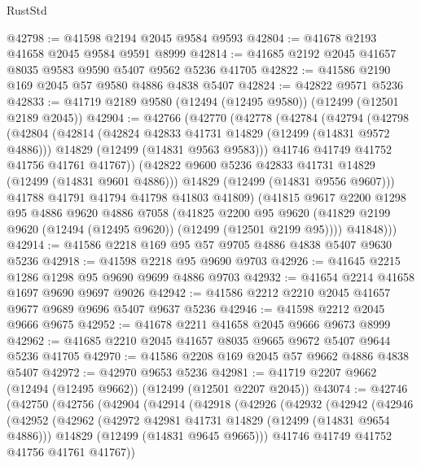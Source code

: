 \begin{lexlean}{RustStd}
\begin{coremodule}
@42798 := @41598 @2194 @2045 @9584 @9593
@42804 := @41678 @2193 @41658 @2045 @9584 @9591 @8999
@42814 := @41685 @2192 @2045 @41657 @8035 @9583 @9590 @5407 @9562 @5236 @41705
@42822 := @41586 @2190 @169 @2045 @57 @9580 @4886 @4838 @5407
@42824 := @42822 @9571 @5236
@42833 := @41719 @2189 @9580 (@12494 (@12495 @9580)) (@12499 (@12501 @2189 @2045))
@42904 := @42766
    (@42770
      (@42778
        (@42784
          (@42794
            (@42798
              (@42804
                (@42814
                  (@42824 @42833 @41731 @14829 (@12499 (@14831 @9572 @4886)))
                  @14829
                  (@12499 (@14831 @9563 @9583)))
                @41746
                @41749
                @41752
                @41756
                @41761
                @41767))
            (@42822 @9600 @5236 @42833 @41731 @14829 (@12499 (@14831 @9601 @4886)))
            @14829
            (@12499 (@14831 @9556 @9607)))
          @41788
          @41791
          @41794
          @41798
          @41803
          @41809)
        (@41815
          @9617
          @2200
          @1298
          @95
          @4886
          @9620
          @4886
          @7058
          (@41825
            @2200
            @95
            @9620
            (@41829 @2199 @9620 (@12494 (@12495 @9620)) (@12499 (@12501 @2199 @95))))
          @41848)))
@42914 := @41586 @2218 @169 @95 @57 @9705 @4886 @4838 @5407 @9630 @5236
@42918 := @41598 @2218 @95 @9690 @9703
@42926 := @41645 @2215 @1286 @1298 @95 @9690 @9699 @4886 @9703
@42932 := @41654 @2214 @41658 @1697 @9690 @9697 @9026
@42942 := @41586 @2212 @2210 @2045 @41657 @9677 @9689 @9696 @5407 @9637 @5236
@42946 := @41598 @2212 @2045 @9666 @9675
@42952 := @41678 @2211 @41658 @2045 @9666 @9673 @8999
@42962 := @41685 @2210 @2045 @41657 @8035 @9665 @9672 @5407 @9644 @5236 @41705
@42970 := @41586 @2208 @169 @2045 @57 @9662 @4886 @4838 @5407
@42972 := @42970 @9653 @5236
@42981 := @41719 @2207 @9662 (@12494 (@12495 @9662)) (@12499 (@12501 @2207 @2045))
@43074 := @42746
    (@42750
      (@42756
        (@42904
          (@42914
            (@42918
              (@42926
                (@42932
                  (@42942
                    (@42946
                      (@42952
                        (@42962
                          (@42972 @42981 @41731 @14829 (@12499 (@14831 @9654 @4886)))
                          @14829
                          (@12499 (@14831 @9645 @9665)))
                        @41746
                        @41749
                        @41752
                        @41756
                        @41761
                        @41767))

\end{coremodule}
\end{lexlean}
